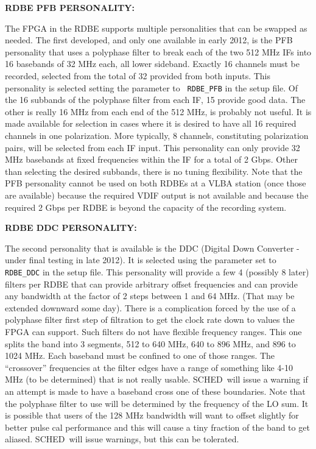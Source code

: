 \documentclass{report}
\newcommand{\schedb}{{\sc SCHED~}}
\begin{document}
{\bf RDBE PFB PERSONALITY:}

The FPGA in the RDBE supports multiple personalities that can be
swapped as needed.  The first developed, and only one available in
early 2012, is the PFB personality that uses a polyphase filter to
break each of the two 512 MHz IFs into 16 basebands of 32 MHz each,
all lower sideband.  Exactly 16 channels must be recorded, selected
from the total of 32 provided from both inputs.  This personality is
selected setting the  parameter to {\tt
RDBE\_PFB} in the setup file.  Of the 16 subbands of the polyphase
filter from each IF, 15 provide good data.  The other is really 16 MHz
from each end of the 512 MHz, is probably not useful.  It is made
available for selection in cases where it is desired to have all 16
required channels in one polarization.  More typically, 8 channels,
constituting polarization pairs, will be selected from each IF input.
This personality can only provide 32 MHz basebands at fixed
frequencies within the IF for a total of 2 Gbps.  Other than selecting
the desired subbands, there is no tuning flexibility.  Note that
the PFB personality cannot be used on both RDBEs at a VLBA station
(once those are available) because the required VDIF output is not
available and because the required 2 Gbps per RDBE is beyond the
capacity of the recording system.


{\bf RDBE DDC PERSONALITY:}

The second personality that is available is the DDC (Digital Down
Converter - under final testing in late 2012).  It is selected using
the  parameter set to {\tt RDBE\_DDC} in
the setup file. This personality will provide a few 4 (possibly 8
later) filters per RDBE that can provide arbitrary offset frequencies
and can provide any bandwidth at the factor of 2 steps between 1 and
64 MHz.  (That may be extended downward some day).  There is a
complication forced by the use of a polyphase filter first step of
filtration to get the clock rate down to values the FPGA can support.
Such filters do not have flexible frequency ranges.  This one splits
the band into 3 segments, 512 to 640 MHz, 640 to 896 MHz, and 896 to
1024 MHz.  Each baseband must be confined to one of those ranges.  The
``crossover'' frequencies at the filter edges have a range of
something like 4-10 MHz (to be determined) that is not really usable.
\schedb will issue a warning if an attempt is made to have a baseband
cross one of these boundaries.  Note that the polyphase filter to use
will be determined by the frequency of the LO sum.  It is possible
that users of the 128 MHz bandwidth will want to offset slightly for
better pulse cal performance and this will cause a tiny fraction of
the band to get aliased.  \schedb will issue warnings, but this can be
tolerated.
\end{document}
